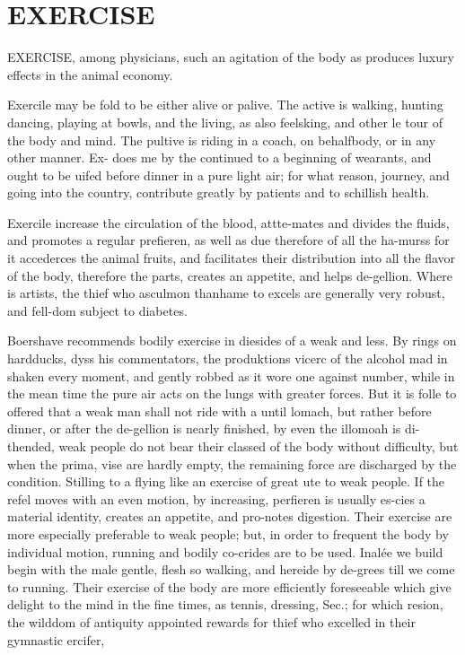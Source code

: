 \documentclass{article}
\begin{document}
\section*{EXERCISE}
EXERCISE, among physicians, such an agitation of the body as produces luxury effects in the animal economy.

Exercile may be fold to be either alive or palive. The active is walking, hunting dancing, playing at bowls, and the living, as also feelsking, and other le tour of the body and mind. The pultive is riding in a coach, on behalfbody, or in any other manner. Ex- does me by the continued to a beginning of wearants, and ought to be uifed before dinner in a pure light air; for what reason, journey, and going into the country, contribute greatly by patients and to schillish health.

Exercile increase the circulation of the blood, attte-mates and divides the fluids, and promotes a regular prefieren, as well as due therefore of all the ha-murss for it accederces the animal fruits, and facilitates their distribution into all the flavor of the body, therefore the parts, creates an appetite, and helps de-gellion. Where is artists, the thief who asculmon thanhame to excels are generally very robust, and fell-dom subject to diabetes.

Boershave recommends bodily exercise in diesides of a weak and less. By rings on hardducks, dyss his commentators, the produktions vicerc of the alcohol mad in shaken every moment, and gently robbed as it wore one against number, while in the mean time the pure air acts on the lungs with greater forces. But it is folle to offered that a weak man shall not ride with a until lomach, but rather before dinner, or after the de-gellion is nearly finished, by even the illomoah is di-thended, weak people do not bear their classed of the body without difficulty, but when the prima, vise are hardly empty, the remaining force are discharged by the condition. Stilling to a flying like an exercise of great ute to weak people. If the refel moves with an even motion, by increasing, perfieren is usually es-cies a material identity, creates an appetite, and pro-notes digestion. Their exercise are more especially preferable to weak people; but, in order to frequent the body by individual motion, running and bodily co-crides are to be used. Inalée we build begin with the male gentle, flesh so walking, and hereide by de-grees till we come to running. Their exercise of the body are more efficiently foreseeable which give delight to the mind in the fine times, as tennis, dressing, Sec.; for which resion, the wilddom of antiquity appointed rewards for thief who excelled in their gymnastic ercifer,
\end{document}
